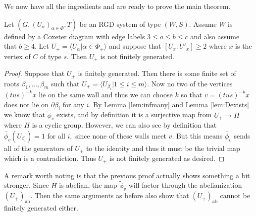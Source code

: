 \documentclass[class=book, crop=false,12 pt]{standalone}
\begin{document}
We now have all the ingredients and are ready to prove the main theorem.

\begin{theorem}
	\label{thm:notfg}
	Let $(G,(U_\alpha)_{\alpha\in \Phi},T)$ be an RGD system of type $(W,S).$ Assume $W$ is defined by a Coxeter diagram with edge labels $3\le a\le b\le c$ and also assume that $b\ge 4.$ Let $U_+=\langle U_\alpha|\alpha\in \Phi_+\rangle$ and suppose that $[U_x:U'_x]\ge 2$ where $x$ is the vertex of $C$ of type $s.$ Then $U_+$ is not finitely generated.
\end{theorem}
\begin{proof}
Suppose that $U_+$ is finitely generated. Then there is some finite set of roots $\beta_1,\dots,\beta_m$ such that $U_+=\langle U_{\beta_i}|1\le i\le m\rangle.$ Now no two of the vertices $(tus)^{-k}x$ lie on the same wall and thus we can choose $k$ so that $v=(tus)^{-k}x$ does not lie on $\partial \beta_i$ for any $i.$ By Lemma \ref{lem:infmany} and Lemma \ref{lem:Dexists} we know that $\tilde{\phi}_v$ exists, and by definition it is a surjective map from $U_+\to H$ where $H$ is a cyclic group. However, we can also see by definition that $\tilde{\phi_v}(U_{\beta_i})=1$ for all $i,$ since none of these walls meet $v.$ But this means $\tilde{\phi_v}$ sends all of the generators of $U_+$ to the identity and thus it must be the trivial map which is a contradiction. Thus $U_+$ is not finitely generated as desired.
\end{proof}

A remark worth noting is that the previous proof actually shows something a bit stronger. Since $H$ is abelian, the map $\tilde{\phi}_v$ will factor through the abelianization $(U_+)_{\text{ab}}.$ Then the same arguments as before also show that $(U_+)_{\text{ab}}$ cannot be finitely generated either.
\end{document}
